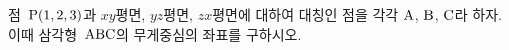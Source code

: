 점~$\mathrm{P}(1{,}\mkern3mu\mathopen{}2{,}\mkern3mu\mathopen{}3)$과 $xy$평면, $yz$평면, $zx$평면에 대하여 대칭인 점을 각각 $\mathrm{A}$, $\mathrm{B}$, $\mathrm{C}$라 하자. 이때 삼각형~$\mathrm{ABC}$의 무게중심의 좌표를 구하시오.
